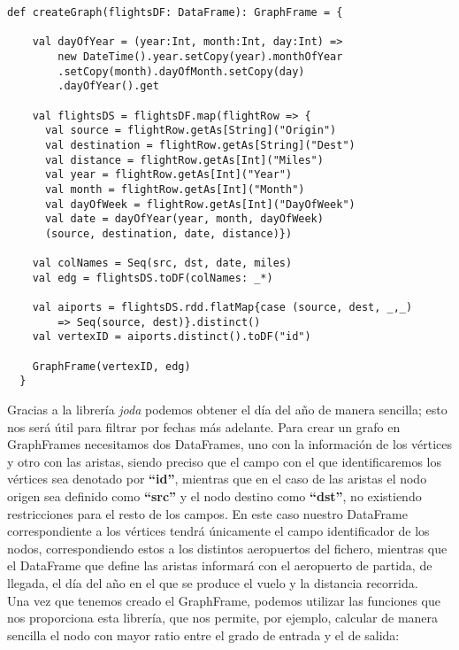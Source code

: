 \begin{lstlisting}[frame=single]
  def createGraph(flightsDF: DataFrame): GraphFrame = {

    val dayOfYear = (year:Int, month:Int, day:Int) => 
    	new DateTime().year.setCopy(year).monthOfYear
    	.setCopy(month).dayOfMonth.setCopy(day)
    	.dayOfYear().get
    
    val flightsDS = flightsDF.map(flightRow => {
      val source = flightRow.getAs[String]("Origin")
      val destination = flightRow.getAs[String]("Dest")
      val distance = flightRow.getAs[Int]("Miles")
      val year = flightRow.getAs[Int]("Year")
      val month = flightRow.getAs[Int]("Month")
      val dayOfWeek = flightRow.getAs[Int]("DayOfWeek")
      val date = dayOfYear(year, month, dayOfWeek)
      (source, destination, date, distance)})

    val colNames = Seq(src, dst, date, miles)
    val edg = flightsDS.toDF(colNames: _*)
    
    val aiports = flightsDS.rdd.flatMap{case (source, dest, _,_) 
    	=> Seq(source, dest)}.distinct()
    val vertexID = aiports.distinct().toDF("id")

    GraphFrame(vertexID, edg)
  }
\end{lstlisting}

Gracias a la librería \textit{joda} podemos obtener el día del año de manera sencilla; esto nos será útil para filtrar por fechas más adelante. Para crear un grafo en GraphFrames necesitamos dos DataFrames, uno con la información de los vértices y otro con las aristas, siendo preciso que el campo con el que identificaremos los vértices sea denotado por \textbf{“id”}, mientras que en el caso de las aristas el nodo origen sea definido como \textbf{“src”} y el nodo destino como \textbf{“dst”}, no existiendo restricciones para el resto de los campos. En este caso nuestro DataFrame correspondiente a los vértices tendrá únicamente el campo identificador de los nodos, correspondiendo estos a los distintos aeropuertos del fichero, mientras  que el DataFrame que define las aristas informará con el aeropuerto de partida, de llegada, el día del año en el que se produce el vuelo y la distancia recorrida.\\

Una vez que tenemos creado el GraphFrame, podemos utilizar las funciones que nos proporciona esta librería, que nos permite, por ejemplo, calcular de manera sencilla el nodo con mayor ratio entre el grado de entrada y el de salida:\\

